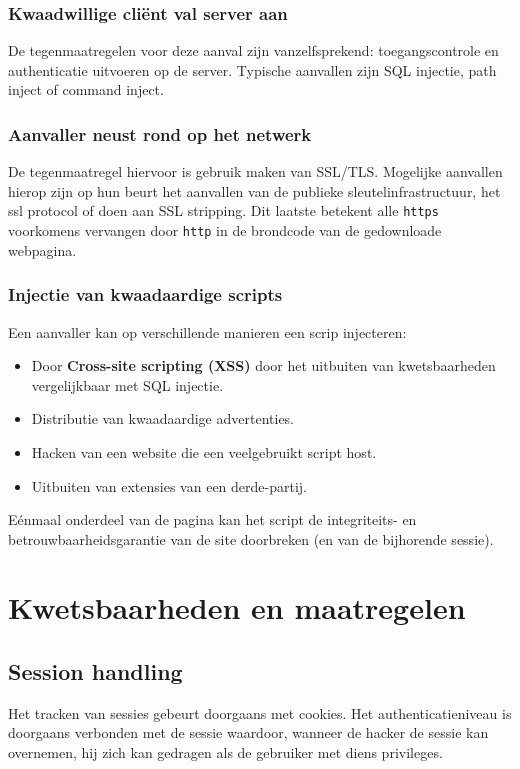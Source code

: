 \documentclass[../main.tex]{subfiles}
\begin{document}
\subsubsection{Kwaadwillige cli\"ent val server aan}
De tegenmaatregelen voor deze aanval zijn vanzelfsprekend: toegangscontrole en authenticatie uitvoeren op de server. Typische aanvallen zijn SQL injectie, path inject of command inject.

\subsubsection{Aanvaller neust rond op het netwerk}
De tegenmaatregel hiervoor is gebruik maken van SSL/TLS. Mogelijke aanvallen hierop zijn op hun beurt het aanvallen van de publieke sleutelinfrastructuur, het ssl protocol of doen aan SSL stripping. Dit laatste betekent alle \texttt{https} voorkomens vervangen door \texttt{http} in de brondcode van de gedownloade webpagina.

\subsubsection{Injectie van kwaadaardige scripts}
Een aanvaller kan op verschillende manieren een scrip injecteren:
\begin{itemize}
	\item Door \textbf{Cross-site scripting (XSS)} door het uitbuiten van kwetsbaarheden vergelijkbaar met SQL injectie.
	\item Distributie van kwaadaardige advertenties.
	\item Hacken van een website die een veelgebruikt script host.
	\item Uitbuiten van extensies van een derde-partij.
\end{itemize}
E\'enmaal onderdeel van de pagina kan het script de integriteits- en betrouwbaarheidsgarantie van de site doorbreken (en van de bijhorende sessie).

\section{Kwetsbaarheden en maatregelen}

\subsection{Session handling}
Het tracken van sessies gebeurt doorgaans met cookies. Het authenticatieniveau is doorgaans verbonden met de sessie waardoor, wanneer de hacker de sessie kan overnemen, hij zich kan gedragen als de gebruiker met diens privileges.
\end{document}

